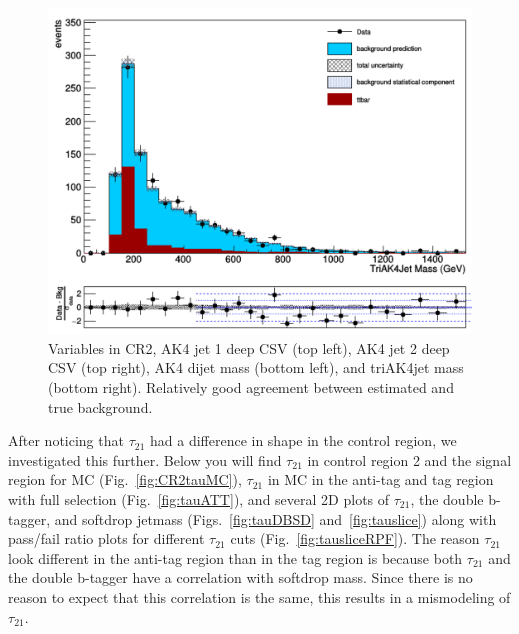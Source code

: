 \begin{figure}[thb!]
\begin{center}
\includegraphics[scale=0.25]{Figures/triAK4jetCR2.pdf}
\end{center}
\caption{Variables in CR2, AK4 jet 1 deep CSV (top left), AK4 jet 2 deep CSV (top right), AK4 dijet mass (bottom left), and triAK4jet mass (bottom right). Relatively good agreement between estimated and true background.}
\label{fig:CR2fin}
\end{figure}

After noticing that $\tau_{21}$ had a difference in shape in the control region, we investigated this further. Below you will find $\tau_{21}$ in control region 2 and the signal region for MC (Fig.~\ref{fig:CR2tauMC}), $\tau_{21}$ in MC in the anti-tag and tag region with full selection (Fig.~\ref{fig:tauATT}), and several 2D plots of $\tau_{21}$, the double b-tagger, and softdrop jetmass (Figs.~\ref{fig:tauDBSD} and~\ref{fig:tauslice}) along with pass/fail ratio plots for different $\tau_{21}$ cuts (Fig.~\ref{fig:tausliceRPF}). The reason $\tau_{21}$ look different in the anti-tag region than in the tag region is because both $\tau_{21}$ and the double b-tagger have a correlation with softdrop mass. Since there is no reason to expect that this correlation is the same, this results in a mismodeling of $\tau_{21}$.

